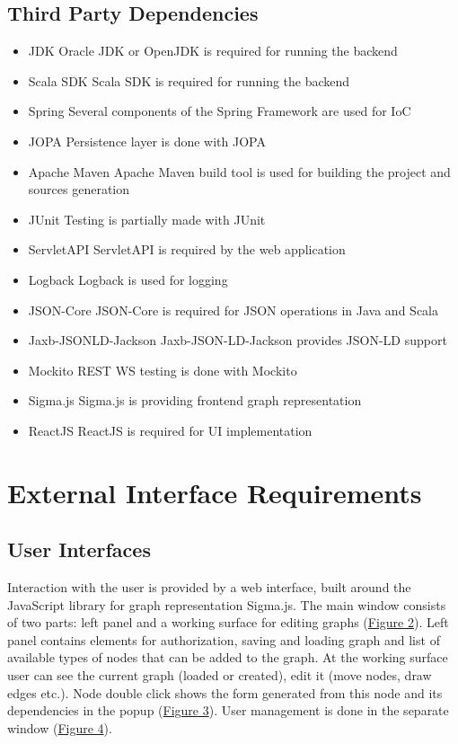 \documentclass{article}
\begin{document}
\subsection{Third Party Dependencies}
\begin{itemize}
    \item JDK
	Oracle JDK or OpenJDK is required for running the backend
    \item Scala SDK
	Scala SDK is required for running the backend
    \item Spring
	Several components of the Spring Framework are used for IoC
    \item JOPA
	Persistence layer is done with JOPA
    \item Apache Maven
	Apache Maven build tool is used for building the project and sources generation
    \item JUnit
	Testing is partially made with JUnit
    \item ServletAPI
	ServletAPI is required by the web application 
    \item Logback
	Logback is used for logging
    \item JSON-Core
	JSON-Core is required for JSON operations in Java and Scala
    \item Jaxb-JSONLD-Jackson
	Jaxb-JSON-LD-Jackson provides JSON-LD support
    \item Mockito
	REST WS testing is done with Mockito
    \item Sigma.js
	Sigma.js is providing frontend graph representation
    \item ReactJS
	ReactJS is required for UI implementation
\end{itemize}
\section{External Interface Requirements}
\subsection{User Interfaces}
Interaction with the user is provided by a web interface, built around the JavaScript library for graph representation Sigma.js. The main window consists of two parts: left panel and a working surface for editing graphs (\hyperref[pic1]{Figure 2}). Left panel contains elements for authorization, saving and loading graph and list of available types of nodes that can be added to the graph. At the working surface user can see the current graph (loaded or created), edit it (move nodes, draw edges etc.). Node double click shows the form generated from this node and its dependencies in the popup (\hyperref[pic2]{Figure 3}). User management is done in the separate window (\hyperref[pic3]{Figure 4}).
\end{document}
